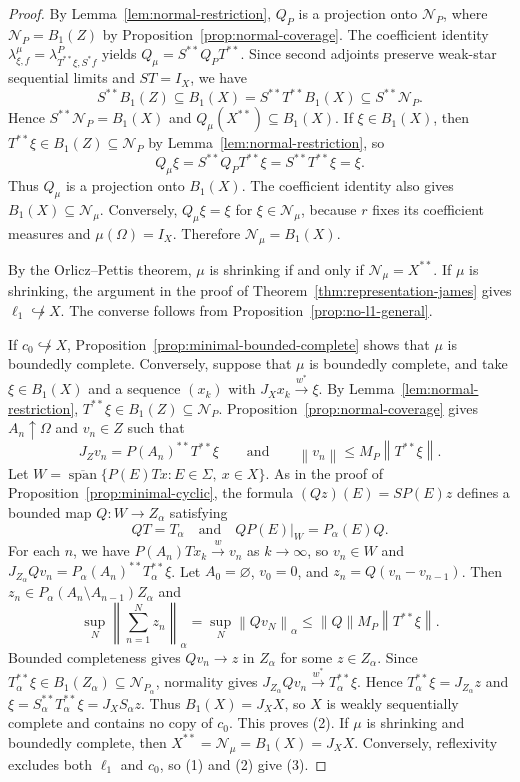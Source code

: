 \documentclass[11pt,leqno]{amsart}
\theoremstyle{compact}
\numberwithin{equation}{section}
\theoremstyle{compactremark}
\theoremstyle{compact}
\def\cspan{\overline{\operatorname{span}}}
\newcommand{\1}{\mathbbm{1}}
\newcommand{\norm}[1]{\left\|#1\right\|}
\begin{document}
\begin{proof}
By Lemma~\ref{lem:normal-restriction}, $Q_P$ is a projection onto $\mathcal N_P$, where $\mathcal N_P=B_1(Z)$ by Proposition~\ref{prop:normal-coverage}. The coefficient identity $\lambda^\mu_{\xi,f}=\lambda^P_{T^{**}\xi,S^*f}$ yields $Q_\mu=S^{**}Q_PT^{**}$. Since second adjoints preserve weak-star sequential limits and $ST=I_X$, we have
\[
S^{**}B_1(Z)\subseteq B_1(X)=S^{**}T^{**}B_1(X)\subseteq S^{**}\mathcal N_P.
\]
Hence $S^{**}\mathcal N_P=B_1(X)$ and $Q_\mu(X^{**})\subseteq B_1(X)$. If $\xi\in B_1(X)$, then $T^{**}\xi\in B_1(Z)\subseteq\mathcal N_P$ by Lemma~\ref{lem:normal-restriction}, so
\[
Q_\mu\xi=S^{**}Q_PT^{**}\xi=S^{**}T^{**}\xi=\xi.
\]
Thus $Q_\mu$ is a projection onto $B_1(X)$. The coefficient identity also gives $B_1(X)\subseteq\mathcal N_\mu$. Conversely, $Q_\mu\xi=\xi$ for $\xi\in\mathcal N_\mu$, because $r$ fixes its coefficient measures and $\mu(\Omega)=I_X$. Therefore $\mathcal N_\mu=B_1(X)$.

By the Orlicz--Pettis theorem, $\mu$ is shrinking if and only if $\mathcal N_\mu=X^{**}$. If $\mu$ is shrinking, the argument in the proof of Theorem~\ref{thm:representation-james} gives $\ell_1\not\hookrightarrow X$. The converse follows from Proposition~\ref{prop:no-l1-general}.

If $c_0\not\hookrightarrow X$, Proposition~\ref{prop:minimal-bounded-complete} shows that $\mu$ is boundedly complete. Conversely, suppose that $\mu$ is boundedly complete, and take $\xi\in B_1(X)$ and a sequence $(x_k)$ with $J_Xx_k\xrightarrow{w^*}\xi$. By Lemma~\ref{lem:normal-restriction}, $T^{**}\xi\in B_1(Z)\subseteq\mathcal N_P$. Proposition~\ref{prop:normal-coverage} gives $A_n\uparrow\Omega$ and $v_n\in Z$ such that
\[
J_Zv_n=P(A_n)^{**}T^{**}\xi \qquad\text{and}\qquad \norm{v_n}\leq M_P\norm{T^{**}\xi}.
\]
Let $W=\cspan\{P(E)Tx:E\in\Sigma,\ x\in X\}$. As in the proof of Proposition~\ref{prop:minimal-cyclic}, the formula $(Qz)(E)=SP(E)z$ defines a bounded map $Q\colon W\to Z_\alpha$ satisfying
\[
QT=T_\alpha\quad\text{and}\quad QP(E)|_W=P_\alpha(E)Q.
\]
For each $n$, we have $P(A_n)Tx_k\xrightarrow{w}v_n$ as $k\to\infty$, so $v_n\in W$ and $ J_{Z_\alpha}Qv_n=P_\alpha(A_n)^{**}T_\alpha^{**}\xi $. Let $A_0=\varnothing$, $v_0=0$, and $z_n=Q(v_n-v_{n-1})$. Then $z_n\in P_\alpha(A_n\setminus A_{n-1})Z_\alpha$ and
\[
\sup_N\norm{\sum_{n=1}^Nz_n}_\alpha=\sup_N\norm{Qv_N}_\alpha\leq\norm{Q}M_P\norm{T^{**}\xi}.
\]
Bounded completeness gives $Qv_n\to z$ in $Z_\alpha$ for some $z\in Z_\alpha$. Since $T_\alpha^{**}\xi\in B_1(Z_\alpha)\subseteq\mathcal N_{P_\alpha}$, normality gives $J_{Z_\alpha}Qv_n\xrightarrow{w^*}T_\alpha^{**}\xi$. Hence $T_\alpha^{**}\xi=J_{Z_\alpha}z$ and $\xi=S_\alpha^{**}T_\alpha^{**}\xi=J_XS_\alpha z$. Thus $B_1(X)=J_XX$, so $X$ is weakly sequentially complete and contains no copy of $c_0$. This proves (2). If $\mu$ is shrinking and boundedly complete, then $X^{**}=\mathcal N_\mu=B_1(X)=J_XX$. Conversely, reflexivity excludes both $\ell_1$ and $c_0$, so (1) and (2) give (3).
\end{proof}
\endgroup
\end{document}
